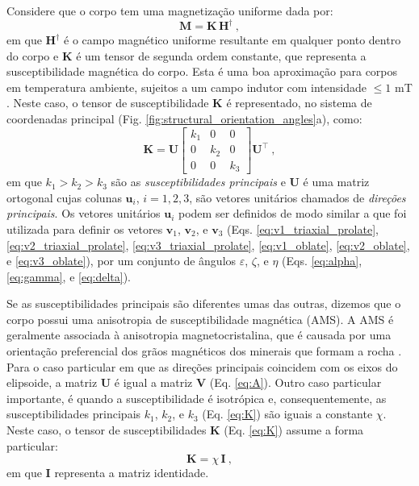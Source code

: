 Considere que o corpo tem uma magnetização uniforme dada por:
\begin{equation}
\mathbf{M} = \mathbf{K} \, \mathbf{H}^{\dagger} \: ,
\label{eq:M-KH}
\end{equation}
em que $\mathbf{H}^{\dagger}$ é o campo magnético uniforme resultante em qualquer ponto dentro do corpo e $\mathbf{K}$ é um tensor de segunda ordem constante, que representa a susceptibilidade magnética do corpo. Esta é uma boa aproximação para corpos em temperatura ambiente, sujeitos a um campo indutor com intensidade $\leq 1$ \unit{mT} \citep{rochette1992}. Neste caso, o tensor de susceptibilidade $\mathbf{K}$ é representado, no sistema de coordenadas principal (Fig. \ref{fig:structural_orientation_angles}a), como:
\begin{equation}
\mathbf{K} = \mathbf{U}
\left[ \begin{array}{ccc}
k_{1} & 0 & 0 \\
0 & k_{2} & 0 \\
0 & 0 & k_{3} 
\end{array} \right] \mathbf{U}^{\top} \: ,
\label{eq:K}
\end{equation}
em que $k_{1} > k_{2} > k_{3}$ são as 
\textit{susceptibilidades principais} e $\mathbf{U}$ é
uma matriz ortogonal cujas colunas $\mathbf{u}_{i}$,
$i = 1, 2, 3$, são vetores unitários chamados de 
\textit{direções principais}.
Os vetores unitários $\mathbf{u}_{i}$ podem ser definidos de modo similar a que foi utilizada para definir os vetores
$\mathbf{v}_{1}$, $\mathbf{v}_{2}$,
e $\mathbf{v}_{3}$ (Eqs. \ref{eq:v1_triaxial_prolate},
\ref{eq:v2_triaxial_prolate}, \ref{eq:v3_triaxial_prolate},
\ref{eq:v1_oblate}, \ref{eq:v2_oblate}, e \ref{eq:v3_oblate}),
por um conjunto de ângulos $\varepsilon$, $\zeta$,
e $\eta$ (Eqs. \ref{eq:alpha}, \ref{eq:gamma}, e
\ref{eq:delta}).

Se as susceptibilidades principais são diferentes umas das outras, dizemos que o corpo possui uma anisotropia de susceptibilidade magnética (AMS). A AMS é geralmente associada à anisotropia magnetocristalina, que é causada por uma orientação preferencial dos grãos magnéticos dos minerais que formam a rocha \citep{fuller1963, uyeda1963, janak1972, hrouda1982, thompson1986, macdonald1987, rochette1992, dunlop1997, tauxe2003rudiments}. Para o caso particular em que as direções principais coincidem com os eixos do elipsoide, a matriz $\mathbf{U}$ é igual a matriz $\mathbf{V}$ (Eq. \ref{eq:A}). Outro caso particular importante, é quando a susceptibilidade é isotrópica e, consequentemente, as susceptibilidades principais $k_{1}$, $k_{2}$, e $k_{3}$ (Eq. \ref{eq:K}) são iguais a constante $\chi$. Neste caso, o tensor de susceptibilidades $\mathbf{K}$ (Eq. \ref{eq:K}) assume a forma particular:
\begin{equation}
\mathbf{K} = \chi \, \mathbf{I} \: ,
\label{eq:K-isotropic}
\end{equation}
em que $\mathbf{I}$ representa a matriz identidade.

